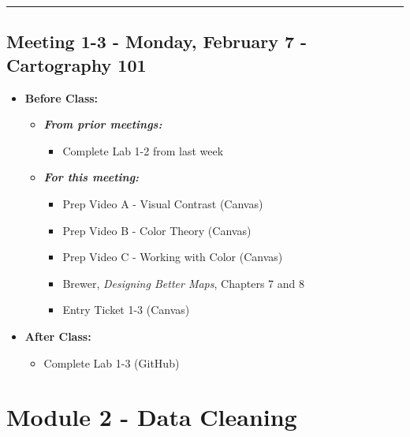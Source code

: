 \documentclass[
]{book}
\providecommand{\tightlist}{%
  \setlength{\itemsep}{0pt}\setlength{\parskip}{0pt}}
\begin{document}
\begin{center}\rule{0.5\linewidth}{0.5pt}\end{center}

\hypertarget{meeting-1-3---monday-february-7---cartography-101}{%
\subsection*{Meeting 1-3 - Monday, February 7 - Cartography 101}\label{meeting-1-3---monday-february-7---cartography-101}}

\begin{itemize}
\tightlist
\item
  \textbf{Before Class:}

  \begin{itemize}
  \tightlist
  \item
    \textbf{\emph{From prior meetings:}}

    \begin{itemize}
    \tightlist
    \item
      Complete Lab 1-2 from last week
    \end{itemize}
  \item
    \textbf{\emph{For this meeting:}}

    \begin{itemize}
    \tightlist
    \item
      Prep Video A - Visual Contrast (Canvas)
    \item
      Prep Video B - Color Theory (Canvas)
    \item
      Prep Video C - Working with Color (Canvas)
    \item
      Brewer, \emph{Designing Better Maps}, Chapters 7 and 8
    \item
      Entry Ticket 1-3 (Canvas)
    \end{itemize}
  \end{itemize}
\item
  \textbf{After Class:}

  \begin{itemize}
  \tightlist
  \item
    Complete Lab 1-3 (GitHub)
  \end{itemize}
\end{itemize}

\hypertarget{module-2---data-cleaning}{%
\section*{Module 2 - Data Cleaning}\label{module-2---data-cleaning}}
\end{document}

